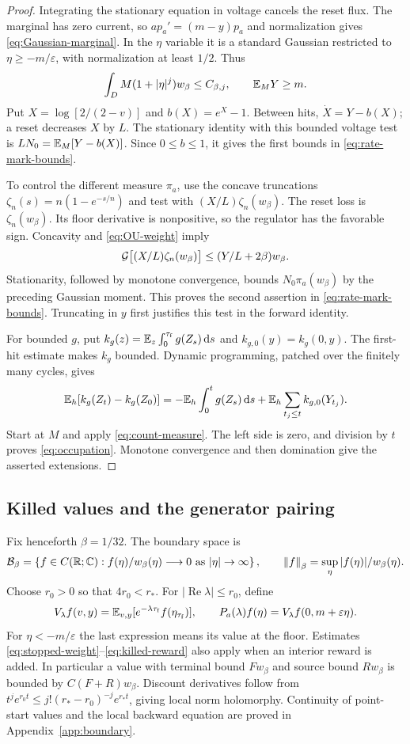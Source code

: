 \begin{proof}
Integrating the stationary equation in voltage cancels the reset flux.
The marginal has zero current, so $ap_a'=(m-y)p_a$ and normalization
gives \eqref{eq:Gaussian-marginal}. In the $\eta$ variable it is a
standard Gaussian restricted to $\eta\ge-m/\varepsilon$, with
normalization at least $1/2$. Thus
\[
 \int_D M(1+|\eta|^j)w_\beta\le C_{\beta,j},\qquad \mathbb E_M Y\ge m.
\]
Put $X=\log[2/(2-v)]$ and $b(X)=e^X-1$. Between hits,
$\dot X=Y-b(X)$; a reset decreases $X$ by $L$. The stationary identity
with this bounded voltage test is
$LN_0=\mathbb E_M[Y-b(X)]$. Since $0\le b\le1$, it gives the first bounds
in \eqref{eq:rate-mark-bounds}.

To control the different measure $\pi_a$, use the concave truncations
$\zeta_n(s)=n(1-e^{-s/n})$ and test with
$(X/L)\zeta_n(w_\beta)$. The reset loss is $\zeta_n(w_\beta)$.
Its floor derivative is nonpositive, so the regulator has the favorable
sign. Concavity and \eqref{eq:OU-weight} imply
\[
 \mathcal G\bigl[(X/L)\zeta_n(w_\beta)\bigr]
       \le (Y/L+2\beta)w_\beta.
\]
Stationarity, followed by monotone convergence, bounds
$N_0\pi_a(w_\beta)$ by the preceding Gaussian moment. This proves the
second assertion in \eqref{eq:rate-mark-bounds}. Truncating in $y$ first
justifies this test in the forward identity.

For bounded $g$, put $k_g(z)=\mathbb E_z\int_0^{\tau_{\mathrm f}} g(Z_s)\,\mathrm d s$ and
$k_{g,0}(y)=k_g(0,y)$. The first-hit estimate makes $k_g$ bounded.
Dynamic programming, patched over the finitely many cycles, gives
\[
 \mathbb E_h[k_g(Z_t)-k_g(Z_0)]
   =-\mathbb E_h\int_0^t g(Z_s)\,\mathrm d s+
                  \mathbb E_h\sum_{t_j\le t}k_{g,0}(Y_{t_j}).
\]
Start at $M$ and apply \eqref{eq:count-measure}. The left side is zero,
and division by $t$ proves \eqref{eq:occupation}. Monotone convergence
\cite[Theorem 1.4.44]{Tao11} and then domination give the asserted extensions.
\end{proof}

\subsection{Killed values and the generator pairing}

Fix henceforth $\beta=1/32$. The boundary space is
\[
 \mathcal B_\beta=\left\{f\in C(\mathbb R;\mathbb C):
       f(\eta)/w_\beta(\eta)\longrightarrow0\text{ as }|\eta|\to\infty\right\},
 \qquad \left\|f\right\|_\beta=\sup_\eta |f(\eta)|/w_\beta(\eta).
\]
Choose $r_0>0$ so that $4r_0<r_*$. For $|\operatorname{Re}\lambda|\le r_0$,
define
\begin{equation}\label{eq:killed-return}
 V_\lambda f(v,y)=\mathbb E_{v,y}[e^{-\lambda{\tau_{\mathrm f}}}f(\eta_{\tau_{\mathrm f}})],
 \qquad
 P_a(\lambda)f(\eta)=V_\lambda f(0,m+\varepsilon\eta).
\end{equation}
For $\eta<-m/\varepsilon$ the last expression means its value at the
floor. Estimates \eqref{eq:stopped-weight}--\eqref{eq:killed-reward}
also apply when an interior reward is added. In particular a value with
terminal bound $F w_\beta$ and source bound $R w_\beta$ is bounded by
$C(F+R)w_\beta$. Discount derivatives follow from
$t^j e^{r_0t}\le j!(r_*-r_0)^{-j}e^{r_*t}$, giving local norm
holomorphy. Continuity of point-start values and the local backward
equation are proved in Appendix~\ref{app:boundary}.

